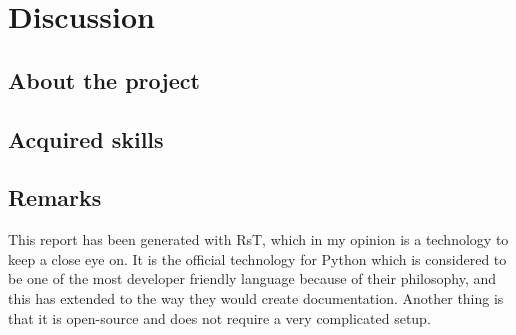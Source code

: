 \chapter{Discussion}

\section{About the project}\label{about-the-project}

\section{Acquired skills}\label{acquired-skills}

\section{Remarks}\label{remarks}

This report has been generated with RsT, which in my opinion is a
technology to keep a close eye on. It is the official technology for
Python which is considered to be one of the most developer friendly
language because of their philosophy, and this has extended to the way
they would create documentation. Another thing is that it is open-source
and does not require a very complicated setup.
